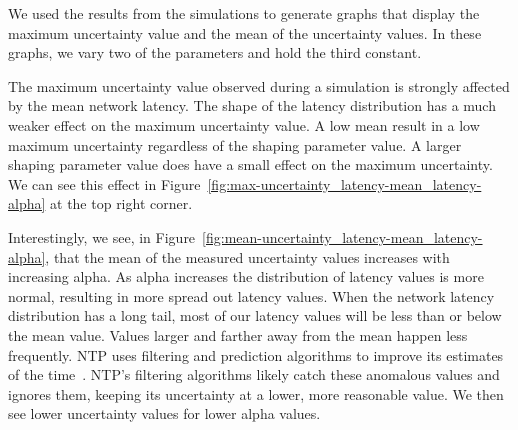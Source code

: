 
We used the results from the simulations to generate graphs that display the
maximum uncertainty value and the mean of the uncertainty values. In these
graphs, we vary two of the parameters and hold the third constant. 

The maximum uncertainty value observed during a simulation is strongly
affected by the mean network latency. The shape of the latency
distribution has a much weaker effect on the maximum uncertainty
value. A low mean result in a low maximum uncertainty regardless of
the shaping parameter value. A larger shaping parameter value does
have a small effect on the maximum uncertainty. We can see this effect
in Figure~\ref{fig:max-uncertainty_latency-mean_latency-alpha} at the
top right corner.

Interestingly, we see, in Figure~\ref{fig:mean-uncertainty_latency-mean_latency-alpha}, that the mean of the measured uncertainty values
increases with increasing alpha. As alpha increases the distribution of 
latency values is more normal, resulting in more spread out latency values.
When the network
latency distribution has a long tail, most of our latency values will be less
than or below the mean value. Values larger and farther away from the
mean happen less frequently. NTP uses
filtering and prediction algorithms to improve its estimates of the
time~\citep{Burbank2010}. NTP's filtering algorithms likely catch
these anomalous values and ignores them, keeping its uncertainty at a
lower, more reasonable value. We then see lower uncertainty values for
lower alpha values.

